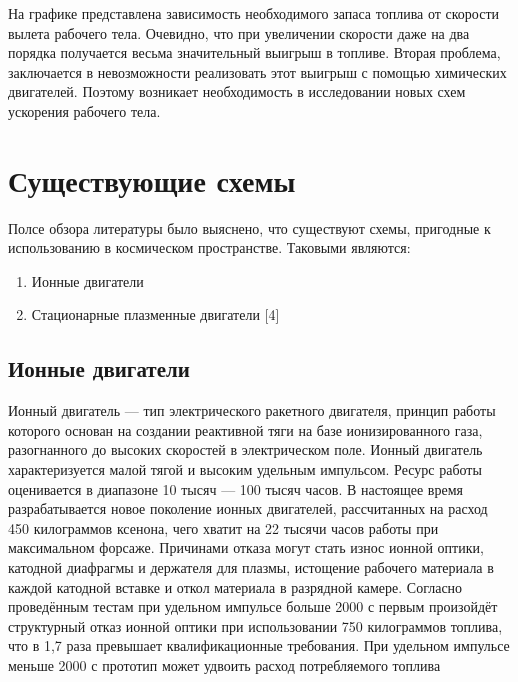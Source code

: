 \documentclass[a4paper,11pt]{article}
\begin{document}
На графике представлена зависимость необходимого запаса топлива от скорости вылета рабочего тела. 
Очевидно, что при увеличении скорости даже на два порядка получается весьма значительный выигрыш в топливе.
\newline
\indent
Вторая проблема, заключается в невозможности реализовать этот выигрыш с помощью химических двигателей. 
Поэтому возникает необходимость в исследовании новых схем ускорения рабочего тела.





\section{\Large Существующие схемы}

Полсе обзора литературы было выяснено, что существуют схемы, пригодные к использованию в космическом пространстве. Таковыми являются: 
\begin{enumerate}
	\item Ионные двигатели
	\item Стационарные плазменные двигатели [4]
\end{enumerate}
\subsection{Ионные двигатели}
Ионный двигатель — тип электрического ракетного двигателя, принцип работы которого основан на создании реактивной тяги на базе ионизированного газа, разогнанного до высоких скоростей в электрическом поле. 
\newline
Ионный двигатель характеризуется малой тягой и высоким удельным импульсом. Ресурс работы оценивается в диапазоне 10 тысяч — 100 тысяч часов. В настоящее время разрабатывается новое поколение ионных двигателей, рассчитанных на расход 450 килограммов ксенона, чего хватит на 22 тысячи часов работы при максимальном форсаже. Причинами отказа могут стать износ ионной оптики, катодной диафрагмы и держателя для плазмы, истощение рабочего материала в каждой катодной вставке и откол материала в разрядной камере. Согласно проведённым тестам при удельном импульсе больше 2000 с первым произойдёт структурный отказ ионной оптики при использовании 750 килограммов топлива, что в 1,7 раза превышает квалификационные требования. При удельном импульсе меньше 2000 с прототип может удвоить расход потребляемого топлива
\end{document}
